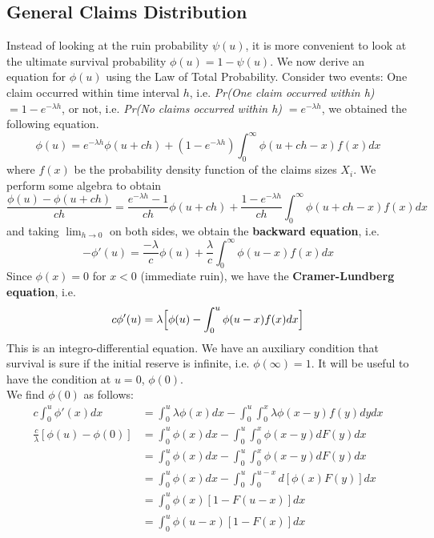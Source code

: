 \documentclass[12pt]{article}
\begin{document}
\subsection{General Claims Distribution}
Instead of looking at the ruin probability \(\psi(u)\), it is more convenient to look at the 
ultimate survival probability \(\phi(u)=1-\psi(u)\).
We now derive an equation for $\phi(u)$ using the Law of Total Probability.
Consider two events: One claim occurred within time interval \(h\), i.e. \textit{Pr(One claim occurred within h) }\(=1-e^{-\lambda h}\), or not, i.e. \textit{Pr(No claims occurred within h) }\(=e^{-\lambda h}\), we obtained the following equation. 
\begin{equation*}
    \phi(u)=e^{-\lambda h}\phi(u+ch)+(1-e^{-\lambda h})\int_{0}^{\infty}\phi(u+ch-x)f(x)dx
\end{equation*}
where \(f(x)\) be the probability density function of 
the claims sizes \(X_i\).  We perform some algebra to obtain
\begin{equation*}
    \frac{\phi(u)-\phi(u+ch)}{ch}=\frac{e^{-\lambda h}-1}{ch}\phi(u+ch)+\frac{1-e^{-\lambda h}}{ch}\int_{0}^{\infty}\phi(u+ch-x)f(x)dx
\end{equation*}
and taking $\displaystyle\lim_{h\to 0}$ on both sides, we obtain the \textbf{backward equation}, i.e.
\begin{equation}
    -\phi'(u)=\frac{-\lambda}{c}\phi(u)+\frac{\lambda}{c}\int_{0}^{\infty}\phi(u-x)f(x)dx
\end{equation}
Since \(\phi(x)=0\) for \(x<0\) (immediate ruin), we have the \textbf{Cramer-Lundberg equation}, i.e.
\begin{equation}\label{CL-eq}
    c\phi'(u)=\lambda\Big[\phi(u)-\int_{0}^{u}\phi(u-x)f(x)dx\Big]\\
\end{equation}
This is an integro-differential equation.  We have an auxiliary condition
that survival is sure if the initial reserve is infinite, i.e. 
\(\phi(\infty)=1\).   It will be useful to 
have the condition at $u=0$,  \(\phi(0)\). \\
We find \(\phi(0)\) as follows:
\begin{align*}
    c\int_{0}^{u}\phi'(x)dx &=\int_{0}^{u}\lambda\phi(x)dx-\int_{0}^{u}\int_{0}^{x}\lambda\phi(x-y)f(y)dydx\\
    \frac{c}{\lambda}[\phi(u)-\phi(0)]&=\int_{0}^{u}\phi(x)dx-\int_{0}^{u}\int_{0}^{x}\phi(x-y)dF(y)dx\\
    &=\int_{0}^{u}\phi(x)dx-\int_{0}^{u}\int_{0}^{x}\phi(x-y)dF(y)dx\\
    &=\int_{0}^{u}\phi(x)dx-\int_{0}^{u}\int_{0}^{u-x}d[\phi(x)F(y)]dx\\
    &=\int_{0}^{u}\phi(x)[1-F(u-x)]dx\\
    &=\int_{0}^{u}\phi(u-x)[1-F(x)]dx\\
\end{align*}
\end{document}
